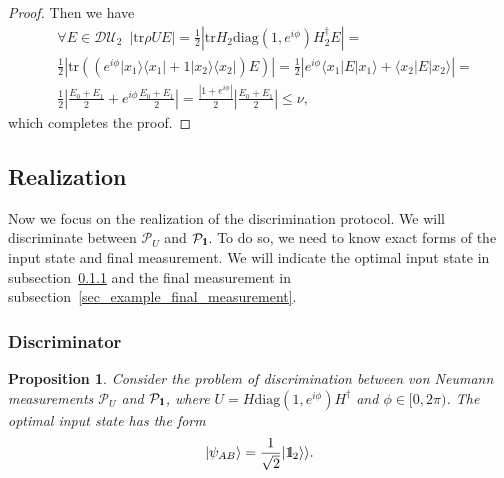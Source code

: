 \documentclass[preprint,12pt, a4paper]{elsarticle}
\newcommand{\ket}[1]{\ensuremath{|#1\rangle}}
\newcommand{\bra}[1]{\ensuremath{\langle#1|}}
\newcommand{\ketbra}[2]{\ensuremath{\ket{#1}\bra{#2}}}
\newcommand{\proj}[1]{\ensuremath{\ketbra{#1}{#1}}}
\newcommand{\1}{{\rm 1\hspace{-0.9mm}l}}
\newcommand{\Id}{{\rm 1\hspace{-0.9mm}l}}
\newcommand{\PP}{\mathcal{P}}
\newcommand{\diaguni}{\ensuremath{\mathcal{DU}}}
\newcommand{\diag}{\mathrm{diag}}
\newcommand{\tr}{\mathrm{tr}}
\newtheorem{proposition}{Proposition}
\begin{document}
\begin{proof}
	Then we have 
\begin{equation}
\begin{split}
& \forall E \in \diaguni_2 \,\,\, | \tr \rho U E | = \frac{1}{2}  \left| \tr H_2 \diag(1, e^{i\phi}) H_2^\dagger E \right| =  \\ &
\frac{1}{2} \left| \tr\left((  e^{i \phi} \proj{x_1} + 1 \proj{x_2} ) E \right) \right|  = 
\frac{1}{2} \left| e^{i \phi}  \bra{x_1} E \ket{x_1} + \bra{x_2} E \ket{x_2} \right| = \\& 
\frac{1}{2} \left| \frac{E_0 + E_1}{2} + e^{i \phi } \frac{E_0+E_1}{2} \right| = 
\frac{\left| 1+ e^{i \phi } \right|}{2} \left| \frac{E_0 + E_1}{2} \right| \le \nu, 
	\end{split}
\end{equation}
	which completes the proof.
\end{proof}


\subsection{Realization}\label{sec:example_realization}
Now we focus on the realization of the discrimination protocol. We will 
discriminate between $\PP_U$ and $\PP_\1$. To do so, we need to know exact 
forms of the input state and final measurement. We will indicate the optimal 
input state in subsection~\ref{sec:example_discriminator} and the final 
measurement in subsection~\ref{sec_example_final_measurement}.


\subsubsection{Discriminator}\label{sec:example_discriminator}

\begin{proposition}
Consider the problem of discrimination between von Neumann measurements $\PP_U$ 
and $\PP_\1$, where $U = H\diag(1, e^{i \phi}) H^\dagger $ and $\phi \in [0, 
2\pi)$.  The optimal input state has the form
\begin{equation}
\ket{\psi_{AB}} = \frac{1}{\sqrt{2}} |\Id_2 \rangle \rangle.
\end{equation}
\end{proposition}

\end{document}

